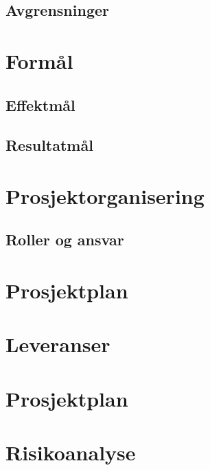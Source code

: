 \documentclass[norsk,a4paper,12pt]{article}
\begin{document}
\subsection{Avgrensninger}

\section{Formål}

\subsection{Effektmål}

\subsection{Resultatmål}

\section{Prosjektorganisering}

\subsection{Roller og ansvar}

\section{Prosjektplan}

\section{Leveranser}

\section{Prosjektplan}

\section{Risikoanalyse}
\end{document}
